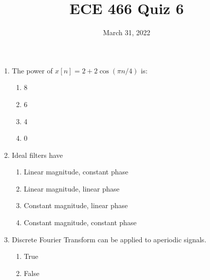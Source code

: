 \documentclass{article}
\date{March 31, 2022}
\begin{document}
 
\title{ECE 466 Quiz 6}
 
\maketitle
 
\begin{enumerate}

    \item The power of $x[n] = 2 + 2\cos(\pi n/4)$ is:
    \begin{enumerate}
        \item 8
        \item 6
        \item 4
        \item 0
    \end{enumerate}
    
    \item Ideal filters have
    \begin{enumerate}
        \item Linear magnitude, constant phase
        \item Linear magnitude, linear phase
        \item Constant magnitude, linear phase
        \item Constant magnitude, constant phase
    \end{enumerate}

    \item Discrete Fourier Transform can be applied to aperiodic signals.
    \begin{enumerate}
        \item True
        \item False
    \end{enumerate}

\end{enumerate}
\end{document}
